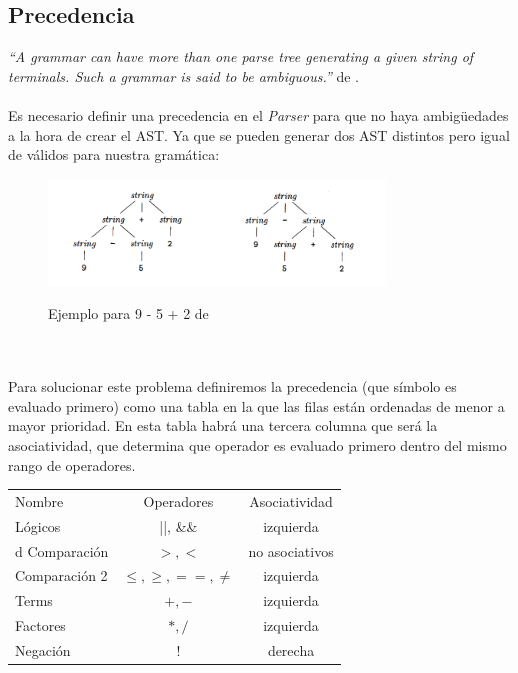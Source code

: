 \subsection{Precedencia}
 \textit{``A grammar can have more than one parse tree generating a given
string of terminals. Such a grammar is said to be ambiguous.''} de \cite{aho2006compilers}.\\\\
Es necesario definir una precedencia en el \textit{Parser} para que no haya ambigüedades a la hora de crear el AST. Ya que se pueden generar dos AST distintos pero igual de válidos para nuestra gramática: \\
\begin{figure}[h] 
    \centering
    \includegraphics[width=0.8\textwidth,keepaspectratio]{img/astambiguos.png}
    \parbox{\linewidth}{\centering Ejemplo para 9 - 5 + 2 de \cite{aho2006compilers}}
    \label{fig:mi_imagen}
\end{figure}
\\\\
Para solucionar este problema definiremos la precedencia (que símbolo es evaluado primero) como una tabla en la que las filas están ordenadas de menor a mayor prioridad. En esta tabla habrá una tercera columna que será la asociatividad, que determina que operador es evaluado primero dentro del mismo rango de operadores.
\begin{center}
\begin{tabular}{ l c c }
 Nombre & Operadores & Asociatividad \\ \cline{1-3}
 Lógicos & ||, \&\&  & izquierda \\  d
 Comparación & $>,<$ & no asociativos \\
 Comparación 2 & $\leq, \geq, ==, \neq$ & izquierda \\
 Terms & $+, -$ & izquierda \\
 Factores & $*, /$ & izquierda \\
 Negación & $!$ & derecha
\end{tabular}
\end{center}
\newpage

